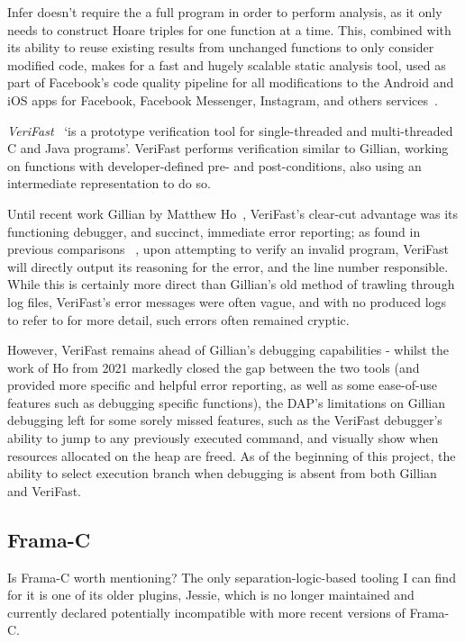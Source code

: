 Infer doesn't require the a full program in order to perform analysis, as it
only needs to construct Hoare triples for one function at a time. This,
combined with its ability to reuse existing results from unchanged functions to
only consider modified code, makes for a fast and hugely scalable static
analysis tool, used as part of Facebook's code quality pipeline for all
modifications to the Android and iOS apps for Facebook, Facebook Messenger,
Instagram, and others services~\cite{infer-about}.


\textit{VeriFast}~\cite{verifast-paper, verifast-repo} `is a prototype
verification tool for single-threaded and multi-threaded C and Java programs'.
VeriFast performs verification similar to Gillian, working on functions with
developer-defined pre- and post-conditions, also using an intermediate
representation to do so.

Until recent work Gillian by Matthew Ho~\cite{gillian-debugging-2021},
VeriFast's clear-cut advantage was its functioning debugger, and succinct,
immediate error reporting; as found in previous comparisons
~\cite{gillian-logging-2020}, upon attempting to verify an invalid program,
VeriFast will directly output its reasoning for the error, and the line number
responsible. While this is certainly more direct than Gillian's old method of
trawling through log files, VeriFast's error messages were often vague, and
with no produced logs to refer to for more detail, such errors often remained
cryptic.

However, VeriFast remains ahead of Gillian's debugging capabilities - whilst
the work of Ho from 2021 markedly closed the gap between the two tools (and
provided more specific and helpful error reporting, as well as some ease-of-use
features such as debugging specific functions), the DAP's limitations on
Gillian debugging left for some sorely missed features, such as the VeriFast
debugger's ability to jump to any previously executed command, and visually
show when resources allocated on the heap are freed. As of the beginning of
this project, the ability to select execution branch when debugging is absent
from both Gillian and VeriFast.

\subsection{Frama-C}

Is Frama-C worth mentioning? The only separation-logic-based tooling I can
find for it is one of its older plugins, Jessie, which is no longer maintained
and currently declared potentially incompatible with more recent versions of
Frama-C.


